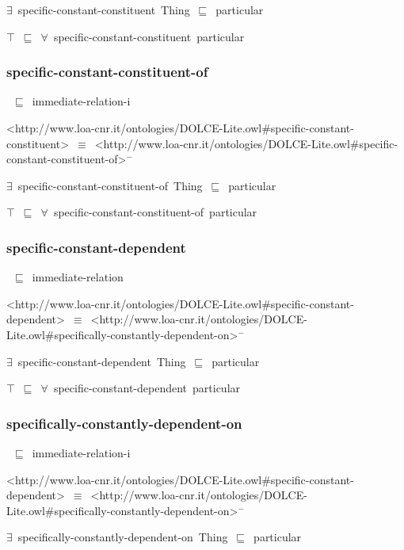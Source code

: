\documentclass{article}
\begin{document}
\ensuremath{\exists}~specific-constant-constituent~Thing~\ensuremath{\sqsubseteq}~particular

\ensuremath{\top}~\ensuremath{\sqsubseteq}~\ensuremath{\forall}~specific-constant-constituent~particular

\subsubsection*{specific-constant-constituent-of}

~\ensuremath{\sqsubseteq}~immediate-relation-i

<http://www.loa-cnr.it/ontologies/DOLCE-Lite.owl#specific-constant-constituent>~\ensuremath{\equiv}~<http://www.loa-cnr.it/ontologies/DOLCE-Lite.owl#specific-constant-constituent-of>\ensuremath{^-}

\ensuremath{\exists}~specific-constant-constituent-of~Thing~\ensuremath{\sqsubseteq}~particular

\ensuremath{\top}~\ensuremath{\sqsubseteq}~\ensuremath{\forall}~specific-constant-constituent-of~particular

\subsubsection*{specific-constant-dependent}

~\ensuremath{\sqsubseteq}~immediate-relation

<http://www.loa-cnr.it/ontologies/DOLCE-Lite.owl#specific-constant-dependent>~\ensuremath{\equiv}~<http://www.loa-cnr.it/ontologies/DOLCE-Lite.owl#specifically-constantly-dependent-on>\ensuremath{^-}

\ensuremath{\exists}~specific-constant-dependent~Thing~\ensuremath{\sqsubseteq}~particular

\ensuremath{\top}~\ensuremath{\sqsubseteq}~\ensuremath{\forall}~specific-constant-dependent~particular

\subsubsection*{specifically-constantly-dependent-on}

~\ensuremath{\sqsubseteq}~immediate-relation-i

<http://www.loa-cnr.it/ontologies/DOLCE-Lite.owl#specific-constant-dependent>~\ensuremath{\equiv}~<http://www.loa-cnr.it/ontologies/DOLCE-Lite.owl#specifically-constantly-dependent-on>\ensuremath{^-}

\ensuremath{\exists}~specifically-constantly-dependent-on~Thing~\ensuremath{\sqsubseteq}~particular
\end{document}
